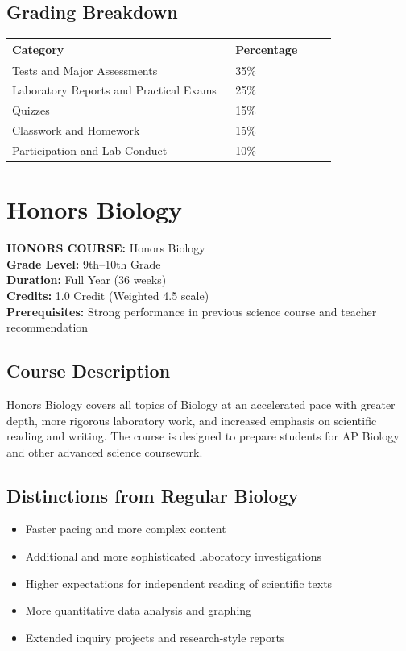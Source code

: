 \documentclass[12pt,oneside]{book}
\begin{document}
\section{Grading Breakdown}
\begin{center}
\begin{tabular}{L{0.55\linewidth}L{0.25\linewidth}}
\toprule
\textbf{Category} & \textbf{Percentage} \\
\midrule
Tests and Major Assessments & 35\% \\
Laboratory Reports and Practical Exams & 25\% \\
Quizzes & 15\% \\
Classwork and Homework & 15\% \\
Participation and Lab Conduct & 10\% \\
\bottomrule
\end{tabular}
\end{center}

\chapter{Honors Biology}

\noindent\textbf{HONORS COURSE:} Honors Biology\\
\textbf{Grade Level:} 9th--10th Grade\\
\textbf{Duration:} Full Year (36 weeks)\\
\textbf{Credits:} 1.0 Credit (Weighted 4.5 scale)\\
\textbf{Prerequisites:} Strong performance in previous science course and teacher recommendation

\section{Course Description}
Honors Biology covers all topics of Biology at an accelerated pace with greater depth, more rigorous
laboratory work, and increased emphasis on scientific reading and writing. The course is designed
to prepare students for AP Biology and other advanced science coursework.

\section{Distinctions from Regular Biology}
\begin{itemize}[leftmargin=2em]
    \item Faster pacing and more complex content
    \item Additional and more sophisticated laboratory investigations
    \item Higher expectations for independent reading of scientific texts
    \item More quantitative data analysis and graphing
    \item Extended inquiry projects and research-style reports
\end{itemize}
\end{document}
